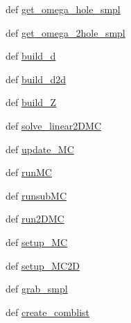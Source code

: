 \begin{DoxyCompactItemize}
\item 
def \hyperlink{namespace_a_l_s_1_1_monte_c_a68c78d574844f7c4a65605c07a8fd09f}{get\+\_\+omega\+\_\+hole\+\_\+smpl}
\item 
def \hyperlink{namespace_a_l_s_1_1_monte_c_ab12b6535dc175ff87ee5a327d44318b6}{get\+\_\+omega\+\_\+2hole\+\_\+smpl}
\item 
def \hyperlink{namespace_a_l_s_1_1_monte_c_aab6d53ba5a4c94719ab818ad25b7a740}{build\+\_\+d}
\item 
def \hyperlink{namespace_a_l_s_1_1_monte_c_ad12819d80b2961a20bbd0a366aedad70}{build\+\_\+d2d}
\item 
def \hyperlink{namespace_a_l_s_1_1_monte_c_a4358bdd8ce84de8601ec1baa5e079a32}{build\+\_\+\+Z}
\item 
def \hyperlink{namespace_a_l_s_1_1_monte_c_a2be308c6d111eec7697d2d77a5ea516a}{solve\+\_\+linear2\+D\+M\+C}
\item 
def \hyperlink{namespace_a_l_s_1_1_monte_c_afed4abf0b95b57b2c76360c0b8c9f6d5}{update\+\_\+\+M\+C}
\item 
def \hyperlink{namespace_a_l_s_1_1_monte_c_a4b19d241a76bbcad841ce2dca1493a42}{run\+M\+C}
\item 
def \hyperlink{namespace_a_l_s_1_1_monte_c_a3da3c7ee66b0aa86760cd5490341d96d}{runsub\+M\+C}
\item 
def \hyperlink{namespace_a_l_s_1_1_monte_c_a9317dc4284f11d9f8f276424ae6b1a6f}{run2\+D\+M\+C}
\item 
def \hyperlink{namespace_a_l_s_1_1_monte_c_ab73b80288b22e5939d5f107b586a7a44}{setup\+\_\+\+M\+C}
\item 
def \hyperlink{namespace_a_l_s_1_1_monte_c_aec5be61bfee29797502d1274f9a9af2b}{setup\+\_\+\+M\+C2\+D}
\item 
def \hyperlink{namespace_a_l_s_1_1_monte_c_ad7043af53c717e02670f7a93efc0982f}{grab\+\_\+smpl}
\item 
def \hyperlink{namespace_a_l_s_1_1_monte_c_a048b6fcb4b4031bd826f3a4ce2b7e19e}{create\+\_\+comblist}
\end{DoxyCompactItemize}


